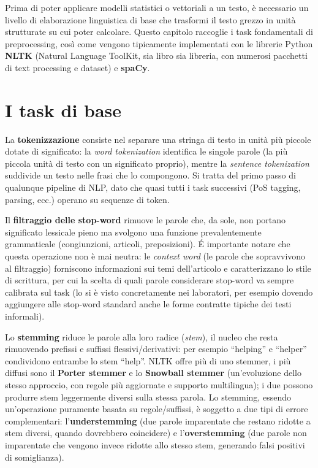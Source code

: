 \documentclass[11pt,a4paper]{report}
\begin{document}
Prima di poter applicare modelli statistici o vettoriali a un testo, è necessario un livello di elaborazione linguistica di base che trasformi il testo grezzo in unità strutturate su cui poter calcolare. Questo capitolo raccoglie i task fondamentali di preprocessing, così come vengono tipicamente implementati con le librerie Python \textbf{NLTK} (Natural Language ToolKit, sia libro sia libreria, con numerosi pacchetti di text processing e dataset) e \textbf{spaCy}.

\section{I task di base}

La \textbf{tokenizzazione} consiste nel separare una stringa di testo in unità più piccole dotate di significato: la \emph{word tokenization} identifica le singole parole (la più piccola unità di testo con un significato proprio), mentre la \emph{sentence tokenization} suddivide un testo nelle frasi che lo compongono. Si tratta del primo passo di qualunque pipeline di NLP, dato che quasi tutti i task successivi (PoS tagging, parsing, ecc.) operano su sequenze di token.

Il \textbf{filtraggio delle stop-word} rimuove le parole che, da sole, non portano significato lessicale pieno ma svolgono una funzione prevalentemente grammaticale (congiunzioni, articoli, preposizioni). \'E importante notare che questa operazione non è mai neutra: le \emph{context word} (le parole che sopravvivono al filtraggio) forniscono informazioni sui temi dell'articolo e caratterizzano lo stile di scrittura, per cui la scelta di quali parole considerare stop-word va sempre calibrata sul task (lo si è visto concretamente nei laboratori, per esempio dovendo aggiungere alle stop-word standard anche le forme contratte tipiche dei testi informali).

Lo \textbf{stemming} riduce le parole alla loro radice (\emph{stem}), il nucleo che resta rimuovendo prefissi e suffissi flessivi/derivativi: per esempio ``helping'' e ``helper'' condividono entrambe lo stem ``help''. NLTK offre più di uno stemmer, i più diffusi sono il \textbf{Porter stemmer} e lo \textbf{Snowball stemmer} (un'evoluzione dello stesso approccio, con regole più aggiornate e supporto multilingua); i due possono produrre stem leggermente diversi sulla stessa parola. Lo stemming, essendo un'operazione puramente basata su regole/suffissi, è soggetto a due tipi di errore complementari: l'\textbf{understemming} (due parole imparentate che restano ridotte a stem diversi, quando dovrebbero coincidere) e l'\textbf{overstemming} (due parole non imparentate che vengono invece ridotte allo stesso stem, generando falsi positivi di somiglianza).
\end{document}
